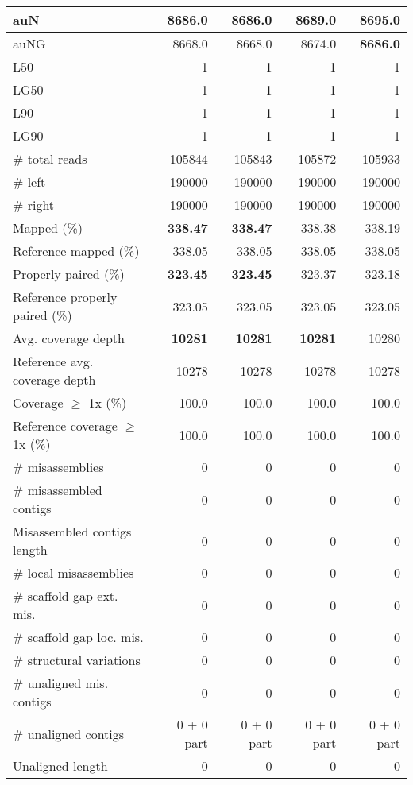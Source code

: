 \documentclass[12pt,a4paper]{article}
\begin{document}
\begin{table}[ht]
\begin{center}
\begin{tabular}{|l*{4}{|r}|}
auN & 8686.0 & 8686.0 & 8689.0 & {\bf 8695.0} \\ \hline
auNG & 8668.0 & 8668.0 & 8674.0 & {\bf 8686.0} \\ \hline
L50 & 1 & 1 & 1 & 1 \\ \hline
LG50 & 1 & 1 & 1 & 1 \\ \hline
L90 & 1 & 1 & 1 & 1 \\ \hline
LG90 & 1 & 1 & 1 & 1 \\ \hline
\# total reads & 105844 & 105843 & 105872 & 105933 \\ \hline
\# left & 190000 & 190000 & 190000 & 190000 \\ \hline
\# right & 190000 & 190000 & 190000 & 190000 \\ \hline
Mapped (\%) & {\bf 338.47} & {\bf 338.47} & 338.38 & 338.19 \\ \hline
Reference mapped (\%) & 338.05 & 338.05 & 338.05 & 338.05 \\ \hline
Properly paired (\%) & {\bf 323.45} & {\bf 323.45} & 323.37 & 323.18 \\ \hline
Reference properly paired (\%) & 323.05 & 323.05 & 323.05 & 323.05 \\ \hline
Avg. coverage depth & {\bf 10281} & {\bf 10281} & {\bf 10281} & 10280 \\ \hline
Reference avg. coverage depth & 10278 & 10278 & 10278 & 10278 \\ \hline
Coverage $\geq$ 1x (\%) & 100.0 & 100.0 & 100.0 & 100.0 \\ \hline
Reference coverage $\geq$ 1x (\%) & 100.0 & 100.0 & 100.0 & 100.0 \\ \hline
\# misassemblies & 0 & 0 & 0 & 0 \\ \hline
\# misassembled contigs & 0 & 0 & 0 & 0 \\ \hline
Misassembled contigs length & 0 & 0 & 0 & 0 \\ \hline
\# local misassemblies & 0 & 0 & 0 & 0 \\ \hline
\# scaffold gap ext. mis. & 0 & 0 & 0 & 0 \\ \hline
\# scaffold gap loc. mis. & 0 & 0 & 0 & 0 \\ \hline
\# structural variations & 0 & 0 & 0 & 0 \\ \hline
\# unaligned mis. contigs & 0 & 0 & 0 & 0 \\ \hline
\# unaligned contigs & 0 + 0 part & 0 + 0 part & 0 + 0 part & 0 + 0 part \\ \hline
Unaligned length & 0 & 0 & 0 & 0 \\ \hline

\end{tabular}
\end{center}
\end{table}
\end{document}
